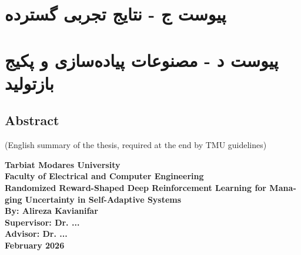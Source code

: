 \documentclass[12pt,a4paper]{report} %
\begin{document}
\chapter*{پیوست ج - نتایج تجربی گسترده}
\clearpage

\chapter*{پیوست د - مصنوعات پیاده‌سازی و پکیج بازتولید}
\clearpage

\newpage

\begin{latin}
\chapter*{Abstract}
(English summary of the thesis, required at the end by TMU guidelines)
\newpage

\begin{center}
    \vspace*{2cm}
    \huge \textbf{Tarbiat Modares University} \\
    \Large \textbf{Faculty of Electrical and Computer Engineering} \\[2cm]
    
    \huge \textbf{Randomized Reward-Shaped Deep Reinforcement Learning for Managing Uncertainty in Self-Adaptive Systems} \\[2cm]
    
    \Large \textbf{By: Alireza Kavianifar} \\[1cm]
    
    \Large \textbf{Supervisor: Dr. ...} \\[1cm]
    
    \Large \textbf{Advisor: Dr. ...} \\[1cm]
    
    \Large \textbf{February 2026}
\end{center}
\end{latin}
\end{document}
